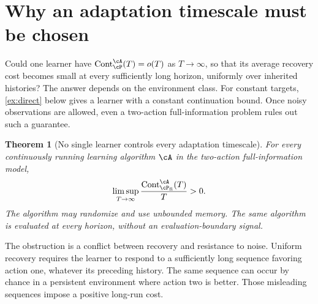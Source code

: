 \documentclass[11pt,twoside]{article}
\newtheorem{theorem}{Theorem}[section]
\theoremstyle{definition}
\theoremstyle{remark}
\DeclareMathOperator{\Cont}{Cont}
\begin{document}
\section{Why an adaptation timescale must be chosen}
\label{sec:timescale}

Could one learner have $\Cont_{\cP}^{\cA}(T)=o(T)$ as $T\to\infty$,
so that its average recovery cost becomes small at every sufficiently long
horizon, uniformly over inherited histories? The answer depends on the
environment class. For constant targets, \cref{ex:direct} below gives a
learner with a constant continuation bound. Once noisy observations are allowed, even a
two-action full-information problem rules out such a guarantee.

\begin{theorem}[No single learner controls every adaptation timescale]
\label{thm:no-all-scales}
For every continuously running learning algorithm $\cA$ in the two-action
full-information model,
\begin{equation}
 \limsup_{T\to\infty}
 \frac{\Cont_{\cP_{\rm fi}}^{\cA}(T)}{T}>0.
 \label{eq:no-all-scales}
\end{equation}
The algorithm may randomize and use unbounded memory. The same algorithm
is evaluated at every horizon, without an evaluation-boundary signal.
\end{theorem}

The obstruction is a conflict between recovery and resistance to noise.
Uniform recovery requires the learner to respond to a sufficiently long
sequence favoring action one, whatever its preceding history. The same
sequence can occur by chance in a persistent environment where action two
is better. Those misleading sequences impose a positive long-run cost.
\end{document}
